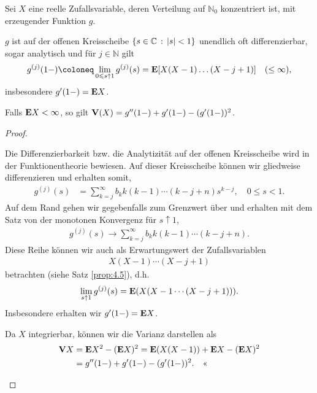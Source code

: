 \begin{prop}
\label{prop:6.2}
Sei $X$ eine reelle Zufallsvariable, deren Verteilung auf
$\mathbb{N}_{0}$ konzentriert ist, mit erzeugender Funktion $g$.\\[-7mm]
\begin{propenum}
\item
$g$ ist auf der offenen Kreisscheibe $\left\{ s\in \mathbb{C}\,:\,| s | < 1\right\}$ unendlich oft
differenzierbar, sogar analytisch und für $j\in \mathbb{N}$ gilt
\begin{align*}
g^{(j)} (1-) \defl\lim\limits_{0\le s \uparrow 1} g^ {(j)} (s) =\E[X(X-1)\ldots
(X-j+1)] \quad (\leq \infty),
\end{align*}
insbesondere $g'(1-) =\textbf{E} X$.
\item
Falls $\textbf{E} X<\infty$, so gilt $\textbf{V}(X) = g'' (1-)+g'(1-) -(g'(1-))^
{2}$.\fishhere
\end{propenum}
\end{prop}
\begin{proof}
\begin{proofenum}
\item Die Differenzierbarkeit bzw. die Analytizität auf der offenen
Kreisscheibe wird in der Funktionentheorie bewiesen. Auf dieser Kreisscheibe
können wir gliedweise differenzieren und erhalten somit,
\begin{align*}
g^{(j)}(s) &= \sum\limits_{k=j}^\infty b_k k(k-1)\cdots (k-j+n)s^{k-j},\quad
0\le s < 1.
\end{align*}
Auf dem Rand gehen wir
gegebenfalls zum Grenzwert über und erhalten mit 
dem Satz von der monotonen Konvergenz für $s\uparrow 1$,
\begin{align*}
g^{(j)}(s) \to \sum\limits_{k=j}^\infty b_k k(k-1)\cdots (k-j+n).
\end{align*} 
Diese Reihe können wir auch als Erwartungswert der Zufallsvariablen
\begin{align*}
X(X-1)\cdots(X-j+1)
\end{align*}
betrachten (siehe Satz \ref{prop:4.5}), d.h.
\begin{align*}
\lim\limits_{s\uparrow 1} g^{(j)}(s) = \textbf{E}(X(X-1\cdots (X-j+1))).
\end{align*}
Insbesondere erhalten wir $g'(1-) = \textbf{E} X$.
\item Da $X$ integrierbar, können wir die Varianz darstellen als
\begin{align*}
\textbf{V} X &= \textbf{E} X^2 - (\textbf{E} X)^2 = \textbf{E}(X(X-1)) + \textbf{E} X - (\textbf{E} X)^2
\\ &= g''(1-) + g'(1-) - (g'(1-))^2.\quad\text{<<}
\end{align*}
\end{proofenum}
\end{proof}

